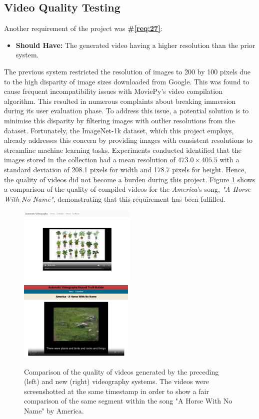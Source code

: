 \documentclass{l4proj}
\begin{document}
\subsection{Video Quality Testing}
Another requirement of the project was \textbf{\#\ref{req:27}}:

\begin{itemize}
    \item \textbf{Should Have:} The generated video having a higher resolution than the prior system.
\end{itemize}

The previous system restricted the resolution of images to 200 by 100 pixels due to the high disparity of image sizes downloaded from Google. This was found to cause frequent incompatibility issues with MoviePy's video compilation algorithm. This resulted in numerous complaints about breaking immersion during its user evaluation phase. To address this issue, a potential solution is to minimise this disparity by filtering images with outlier resolutions from the dataset. Fortunately, the ImageNet-1k dataset, which this project employs, already addresses this concern by providing images with consistent resolutions to streamline machine learning tasks. Experiments conducted identified that the images stored in the collection had a mean resolution of $473.0 \times 405.5$ with a standard deviation of 208.1 pixels for width and 178.7 pixels for height. Hence, the quality of videos did not become a burden during this project. Figure \ref{fig:video_quality_comp} shows a comparison of the quality of compiled videos for the \emph{America}'s song, \emph{"A Horse With No Name"}, demonstrating that this requirement has been fulfilled.

\begin{figure}
    \centering
    \includegraphics[width=0.5\textwidth]{figures/ahwnn_quality_p.pdf}
    \includegraphics[width=0.49\textwidth]{figures/ahwnn_quality_c.pdf}
    \caption{Comparison of the quality of videos generated by the preceding (left) and new (right) videography systems. The videos were screenshotted at the same timestamp in order to show a fair comparison of the same segment within the song "A Horse With No Name" by America.}
    \label{fig:video_quality_comp}
\end{figure}
\end{document}
